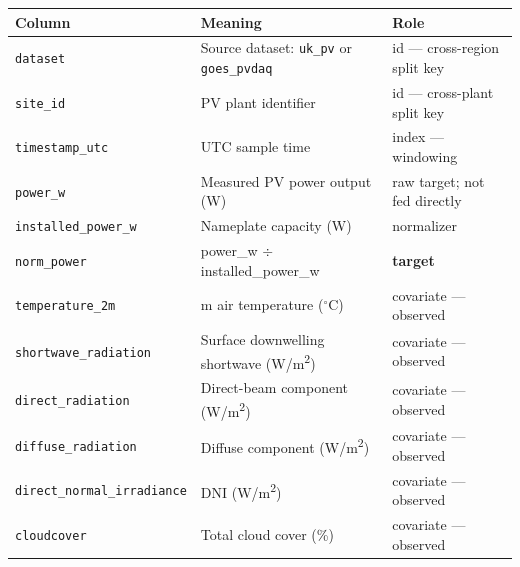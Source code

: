 \documentclass[
  9pt,
]{article}
\begin{document}
\begin{longtable}[]{@{}
  >{\raggedright\arraybackslash}p{}
  >{\raggedright\arraybackslash}p{}
  >{\raggedright\arraybackslash}p{}@{}}
\toprule\noalign{}
\begin{minipage}[b]{\linewidth}\raggedright
Column
\end{minipage} & \begin{minipage}[b]{\linewidth}\raggedright
Meaning
\end{minipage} & \begin{minipage}[b]{\linewidth}\raggedright
Role
\end{minipage} \\
\midrule\noalign{}
\endhead
\bottomrule\noalign{}
\endlastfoot
\texttt{dataset} & Source dataset: \texttt{uk\_\allowbreak{}pv} or
\texttt{goes\_\allowbreak{}pvdaq} & id --- cross-region split key \\
\texttt{site\_\allowbreak{}id} & PV plant identifier & id --- cross-plant split
key \\
\texttt{timestamp\_\allowbreak{}utc} & UTC sample time & index --- windowing \\
\texttt{power\_\allowbreak{}w} & Measured PV power output (W) & raw target; not fed
directly \\
\texttt{installed\_\allowbreak{}power\_\allowbreak{}w} & Nameplate capacity (W) & normalizer \\
\texttt{norm\_\allowbreak{}power} & power\_\allowbreak{}w \(\div\) installed\_\allowbreak{}power\_\allowbreak{}w &
\textbf{target} \\
\texttt{temperature\_\allowbreak{}2m} & 2 m air temperature (\(^\circ\)C) & covariate ---
observed \\
\texttt{shortwave\_\allowbreak{}radiation} & Surface downwelling shortwave (W/m\textsuperscript{2}) &
covariate --- observed \\
\texttt{direct\_\allowbreak{}radiation} & Direct-beam component (W/m\textsuperscript{2}) & covariate
--- observed \\
\texttt{diffuse\_\allowbreak{}radiation} & Diffuse component (W/m\textsuperscript{2}) & covariate ---
observed \\
\texttt{direct\_\allowbreak{}normal\_\allowbreak{}irradiance} & DNI (W/m\textsuperscript{2}) & covariate ---
observed \\
\texttt{cloudcover} & Total cloud cover (\%) & covariate --- observed \\

\end{longtable}
\end{document}
